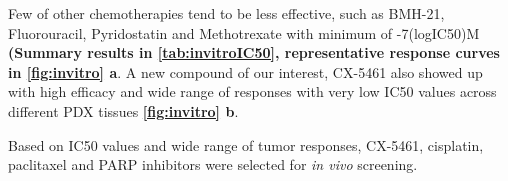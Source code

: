 Few of other chemotherapies tend to be less effective, such as BMH-21, Fluorouracil, Pyridostatin and Methotrexate with minimum of -7(logIC50)M  \textbf{(Summary results in \autoref{tab:invitroIC50}, representative response curves in \autoref{fig:invitro} a}. A new compound of our interest, CX-5461 also showed up with high efficacy and wide range of responses with very low IC50 values across different PDX tissues \textbf{\autoref{fig:invitro} b}. 



Based on IC50 values and wide range of tumor responses,  CX-5461, cisplatin, paclitaxel and PARP inhibitors were selected for \textit{in vivo} screening.

